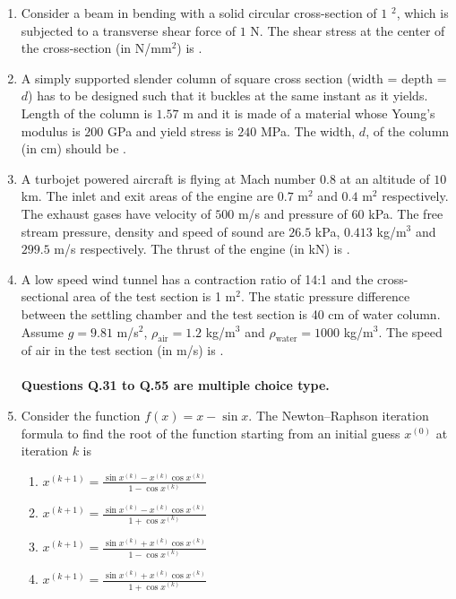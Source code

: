 \documentclass{article}
\begin{document}
\begin{enumerate}
\item Consider a beam in bending with a solid circular cross-section of $1$ $^2$, which is subjected to a transverse shear force of $1$ N. The shear stress at the center of the cross-section (in N/mm$^2$) is \underline{\hspace{2cm}}.

\item A simply supported slender column of square cross section (width = depth = $d$) has to be designed such that it buckles at the same instant as it yields. Length of the column is $1.57$ m and it is made of a material whose Young’s modulus is $200$ GPa and yield stress is $240$ MPa. The width, $d$, of the column (in cm) should be \underline{\hspace{2cm}}.

\item A turbojet powered aircraft is flying at Mach number $0.8$ at an altitude of $10$ km. The inlet and exit areas of the engine are $0.7$ m$^2$ and $0.4$ m$^2$ respectively. The exhaust gases have velocity of $500$ m/s and pressure of $60$ kPa. The free stream pressure, density and speed of sound are $26.5$ kPa, $0.413$ kg/m$^3$ and $299.5$ m/s respectively. The thrust of the engine (in kN) is \underline{\hspace{2cm}}.

\item A low speed wind tunnel has a contraction ratio of 14:1 and the cross-sectional area of the test section is 1 m$^2$. The static pressure difference between the settling chamber and the test section is 40 cm of water column. Assume $g=9.81$ m/s$^2$, $\rho_{\text{air}}=1.2$ kg/m$^3$ and $\rho_{\text{water}}=1000$ kg/m$^3$. The speed of air in the test section (in m/s) is \underline{\hspace{2cm}}.
\\\\
\textbf{Questions Q.31 to Q.55 are multiple choice type.}

\item Consider the function $f(x)=x-\sin x$. The Newton–Raphson iteration formula to find the root of the function starting from an initial guess $x^{(0)}$ at iteration $k$ is
\begin{multicols}{2}
\begin{enumerate}
\item $x^{(k+1)}=\frac{\sin x^{(k)}- x^{(k)}\cos x^{(k)}}{1-\cos x^{(k)}}$
\item $x^{(k+1)}=\frac{\sin x^{(k)}- x^{(k)}\cos x^{(k)}}{1+\cos x^{(k)}}$
\item $x^{(k+1)}=\frac{\sin x^{(k)}+ x^{(k)}\cos x^{(k)}}{1-\cos x^{(k)}}$
\item $x^{(k+1)}=\frac{\sin x^{(k)}+ x^{(k)}\cos x^{(k)}}{1+\cos x^{(k)}}$
\end{enumerate}
\end{multicols}


\end{enumerate}
\end{document}

